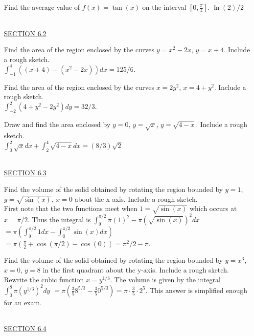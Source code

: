 \documentclass{exam}
\begin{document}
\begin{questions}
\question Find the average value of $f(x)=\tan(x)$ on the interval $\left[ 0, \frac{\pi}{4} \right]$.  {\color{red}  $\ln(2)/2$}



\ \\
\underline{SECTION 6.2}

\question Find the area of the region enclosed by the curves $y=x^2-2x$, $y=x+4$.  Include a rough sketch. 
\\ {\color{red}   $\displaystyle\int_{-1}^4 \left(  (x+4)-(x^2-2x) \right)  dx = 125/6$.}

\question Find the area of the region enclosed by the curves $x=2y^2$, $x=4+y^2$.   Include a rough sketch. 
\\ {\color{red}   $\displaystyle\int_{-2}^2 (4+y^2-2y^2)dy = 32/3$.}

\question Draw and find the area enclosed by $y=0$, $y=\sqrt{x}$, $y=\sqrt{4-x}$.  Include a rough sketch.  
\\ {\color{red} $\displaystyle\int_0^2 \sqrt{x} dx + \displaystyle\int_2^4 \sqrt{4-x}dx = (8/3)\sqrt{2}$}

    \newpage\thispagestyle{empty}

\ \\
\underline{SECTION 6.3 }

\question Find the volume of the solid obtained by rotating the region bounded by $y = 1$, $y= \sqrt{\sin(x)}$, $x=0$ about the x-axis.   Include a rough sketch.
\\ {\color{red} First note that the two functions meet when $1=\sqrt{\sin(x)}$ which occurs at $x=\pi/2$.  Thus the integral is $\displaystyle\int_0^{\pi/2} \pi \left( 1 \right)^2 - \pi \left( \sqrt{\sin(x)} \right)^2 dx$  $ = \pi \left( \displaystyle\int_0^{\pi/2}{ 1 dx} - \displaystyle\int_0^{\pi/2} \sin(x)dx \right)$ $ = \pi \left( \frac{\pi}{2} + \cos(\pi/2) - \cos(0)\right) = \pi^2/2 - \pi$.}  

\question Find the volume of the solid obtained by rotating the region bounded by $y=x^3$, $x=0$, $y = 8$ in the first quadrant about the y-axis.   Include a rough sketch.
\\ {\color{red} Rewrite the cubic function $x =  y^{1/3}$.  The volume is given by the integral $\displaystyle\int_0^{8} \pi \left( y^{1/3} \right)^2 dy$ $ = \pi \left( \frac{3}{5}8^{5/3} - \frac{3}{5}0^{5/3}   \right) = \pi \cdot \frac{3}{5}\cdot 2^5$. This answer is simplified enough for an exam.}

\ \\
\underline{SECTION 6.4 }


\end{questions}
\end{document}
